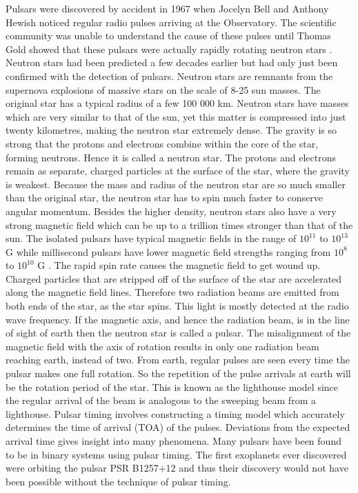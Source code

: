 \documentclass[12pt]{article}
\begin{document}
	Pulsars were discovered by accident in 1967 when Jocelyn Bell and Anthony Hewish noticed regular radio pulses arriving at the Observatory. The scientific community was unable to understand the cause of these pulses until Thomas Gold showed that these pulsars were actually rapidly rotating neutron stars \cite{gold1968rotating}. Neutron stars had been predicted a few decades earlier but had only just been confirmed with the detection of pulsars. Neutron stars are remnants from the supernova explosions of massive stars on the scale of 8-25 sun masses. The original star has a typical radius of a few 100 000 km. Neutron stars have masses which are very similar to that of the sun, yet this matter is compressed into just twenty kilometres, making the neutron star extremely dense. The gravity is so strong that the protons and electrons combine within the core of the star, forming neutrons. Hence it is called a neutron star. The protons and electrons remain as separate, charged particles at the surface of the star, where the gravity is weakest. Because the mass and radius of the neutron star are so much smaller than the original star, the neutron star has to spin much faster to conserve angular momentum. Besides the higher density, neutron stars also have a very strong magnetic field which can be up to a trillion times stronger than that of the sun. The isolated pulsars have typical magnetic fields in the range of $10^{11}$ to $10^{13}$ G while millisecond pulsars have lower magnetic field strengths ranging from $10^{8}$ to $10^{10
	}$ G \cite{bisnovatyi2006binary}. The rapid spin rate causes the magnetic field to get wound up. Charged particles that are stripped off of the surface of the star are accelerated along the magnetic field lines. Therefore two radiation beams are emitted from both ends of the star, as the star spins. This light is mostly detected at the radio wave frequency. If the magnetic axis, and hence the radiation beam, is in the line of sight of earth then the neutron star is called a pulsar. The misalignment of the magnetic field with the axis of rotation results in only one radiation beam reaching earth, instead of two. From earth, regular pulses are seen every time the pulsar makes one full rotation. So the repetition of the pulse arrivals at earth will be the rotation period of the star. This is known as the lighthouse model since the regular arrival of the beam is analogous to the sweeping beam from a lighthouse. Pulsar timing involves constructing a timing model which accurately determines the time of arrival (TOA) of the pulses. Deviations from the expected arrival time gives insight into many phenomena.  Many pulsars have been found to be in binary systems using pulsar timing. The first exoplanets ever discovered were orbiting the pulsar PSR B1257+12 and thus their discovery would not have been possible without the technique of pulsar timing.\\ 
	
\end{document}
